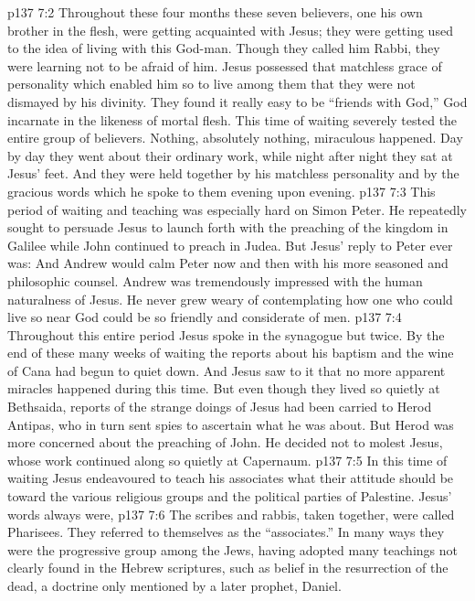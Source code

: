 \vs p137 7:2 Throughout these four months these seven believers, one his own brother in the flesh, were getting acquainted with Jesus; they were getting used to the idea of living with this God\hyp{}man. Though they called him Rabbi, they were learning not to be afraid of him. Jesus possessed that matchless grace of personality which enabled him so to live among them that they were not dismayed by his divinity. They found it really easy to be “friends with God,” God incarnate in the likeness of mortal flesh. This time of waiting severely tested the entire group of believers. Nothing, absolutely nothing, miraculous happened. Day by day they went about their ordinary work, while night after night they sat at Jesus’ feet. And they were held together by his matchless personality and by the gracious words which he spoke to them evening upon evening.
\vs p137 7:3 This period of waiting and teaching was especially hard on Simon Peter. He repeatedly sought to persuade Jesus to launch forth with the preaching of the kingdom in Galilee while John continued to preach in Judea. But Jesus’ reply to Peter ever was:  And Andrew would calm Peter now and then with his more seasoned and philosophic counsel. Andrew was tremendously impressed with the human naturalness of Jesus. He never grew weary of contemplating how one who could live so near God could be so friendly and considerate of men.
\vs p137 7:4 Throughout this entire period Jesus spoke in the synagogue but twice. By the end of these many weeks of waiting the reports about his baptism and the wine of Cana had begun to quiet down. And Jesus saw to it that no more apparent miracles happened during this time. But even though they lived so quietly at Bethsaida, reports of the strange doings of Jesus had been carried to Herod Antipas, who in turn sent spies to ascertain what he was about. But Herod was more concerned about the preaching of John. He decided not to molest Jesus, whose work continued along so quietly at Capernaum.
\vs p137 7:5 In this time of waiting Jesus endeavoured to teach his associates what their attitude should be toward the various religious groups and the political parties of Palestine. Jesus’ words always were, 
\vs p137 7:6 \pc The scribes and rabbis, taken together, were called Pharisees. They referred to themselves as the “associates.” In many ways they were the progressive group among the Jews, having adopted many teachings not clearly found in the Hebrew scriptures, such as belief in the resurrection of the dead, a doctrine only mentioned by a later prophet, Daniel.
